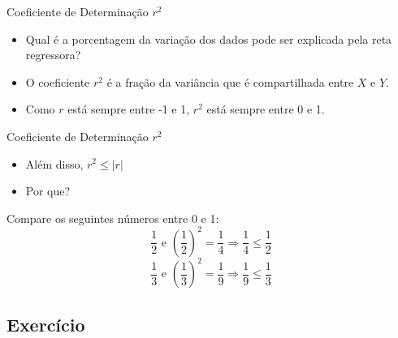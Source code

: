 \documentclass{beamer}
\begin{document}
\begin{frame}{Coeficiente de Determinação $r^2$}
  \begin{itemize}
  \item Qual é a porcentagem da variação dos dados pode ser explicada
    pela reta regressora?
  \item O coeficiente $r^2$ é a fração da variância que é
    compartilhada entre $X$ e $Y$.
  \item Como $r$ está sempre entre -1 e 1, $r^2$ está sempre entre 0 e
    1.
  \end{itemize}
\end{frame}

\begin{frame}{Coeficiente de Determinação $r^2$}
  \begin{itemize}
  \item Além disso, $r^2 \le |r|$
  \item Por que?
  \end{itemize}
  \begin{block}{}
    Compare os seguintes números entre 0 e 1:
    \begin{displaymath}
      \frac{1}{2} \text{ e } \left(\frac{1}{2}\right)^2=\frac{1}{4} \Rightarrow
      \frac{1}{4} \le \frac{1}{2}
    \end{displaymath}
    \begin{displaymath}
      \frac{1}{3} \text{ e } \left(\frac{1}{3}\right)^2=\frac{1}{9} \Rightarrow
      \frac{1}{9} \le \frac{1}{3}
    \end{displaymath}
  \end{block}
\end{frame}



\subsection{Exercício}
\end{document}
